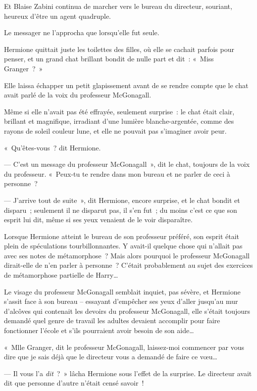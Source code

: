 Et Blaise Zabini continua de marcher vers le bureau du directeur, souriant, heureux d'être un agent quadruple.


Le messager ne l'approcha que lorsqu'elle fut seule.

Hermione quittait juste les toilettes des filles, où elle se cachait parfois pour penser, et un grand chat brillant bondit de nulle part et dit~: «~Miss Granger~?~»

Elle laissa échapper un petit glapissement avant de se rendre compte que le chat avait parlé de la voix du professeur McGonagall.

Même si elle n'avait pas été effrayée, seulement surprise~: le chat était clair, brillant et magnifique, irradiant d'une lumière blanche-argentée, comme des rayons de soleil couleur lune, et elle ne pouvait pas s'imaginer avoir peur.

«~Qu'êtes-vous~? dit Hermione.

--- C'est un message du professeur McGonagall~», dit le chat, toujours de la voix du professeur. «~Peux-tu te rendre dans mon bureau et ne parler de ceci à personne~?

--- J'arrive tout de suite~», dit Hermione, encore surprise, et le chat bondit et disparu~; seulement il ne disparut pas, il s'en fut~; du moins c'est ce que son esprit lui dit, même si ses yeux venaient de le voir disparaître.

Lorsque Hermione atteint le bureau de son professeur préféré, son esprit était plein de spéculations tourbillonnantes. Y avait-il quelque chose qui n'allait pas avec ses notes de métamorphose~? Mais alors pourquoi le professeur McGonagall dirait-elle de n'en parler à personne~? C'était probablement au sujet des exercices de métamorphose partielle de Harry…

Le visage du professeur McGonagall semblait inquiet, pas sévère, et Hermione s'assit face à son bureau -- essayant d'empêcher ses yeux d'aller jusqu'au mur d'alcôves qui contenait les devoirs du professeur McGonagall, elle s'était toujours demandé quel genre de travail les adultes devaient accomplir pour faire fonctionner l'école et s'ils pourraient avoir besoin de son aide…

«~Mlle Granger, dit le professeur McGonagall, laissez-moi commencer par vous dire que je sais déjà que le directeur vous a demandé de faire ce vœu…

--- Il vous l'a \emph{dit}~?~» lâcha Hermione sous l'effet de la surprise. Le directeur avait dit que personne d'autre n'était censé savoir~!

